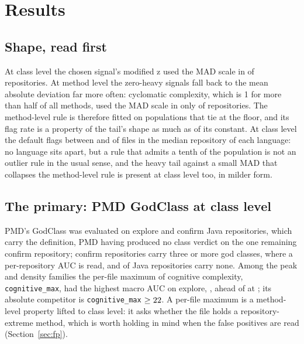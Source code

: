 \documentclass[11pt,a4paper]{article}
\newcommand{\sig}[1]{\texttt{#1}}
\begin{document}
\section{Results}

\subsection{Shape, read first}
\label{sec:diag}

At class level the chosen signal's modified z used the MAD scale in
\scaleCogMaxMad{} of repositories. At method level the zero-heavy signals fall
back to the mean absolute deviation far more often: cyclomatic complexity,
which is 1 for more than half of all methods, used the MAD scale in only
\scaleMethodCcMad{} of repositories. The method-level rule is therefore fitted
on populations that tie at the floor, and its flag rate is a property of the
tail's shape as much as of its constant. At class level the default flags
between \flagClassMadMin{} and \flagClassMadMax{} of files in the median
repository of each language: no language sits apart, but a rule that admits a
tenth of the population is not an outlier rule in the usual sense, and the
heavy tail against a small MAD that collapses the method-level rule is present
at class level too, in milder form.

\subsection{The primary: PMD GodClass at class level}
\label{sec:primary}

PMD's GodClass was evaluated on \primCarryEx{} explore and \primCarryCo{}
confirm Java repositories, which carry the definition, PMD having produced no
class verdict on the one remaining confirm repository; \primMinPosCo{} confirm repositories carry three or more
god classes, where a per-repository AUC is read, and \pmdGodFreeShare{} of
Java repositories carry none. Among the peak and density families the
per-file maximum of cognitive complexity, \sig{cognitive\_max}, had the
highest macro AUC on explore, \primExploreAuc{}, ahead of \primExploreSecond{}
at \primExploreSecondAuc{}; its absolute competitor is \sig{cognitive\_max}
$\geq 22$. A per-file maximum is a method-level property lifted to class
level: it asks whether the file holds a repository-extreme method, which is
worth holding in mind when the false positives are read
(Section~\ref{sec:fp}).
\end{document}
